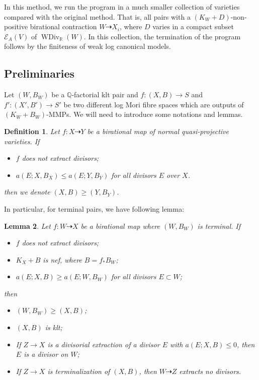 \documentclass[11pt]{amsart}
\newtheorem{defn}{Definition}[section]
\newtheorem{lem}[defn]{Lemma}
\begin{document}
In this method, we run the program in a much smaller collection of varieties compared with the original method. That is, all pairs with a $(K_{W}+D)$-non-positive birational contraction $W\dashrightarrow X_{i}$, where $D$ varies in a compact subset $\mathcal{E}_{A}(V)$ of $\operatorname{WDiv}_{\mathbb{R}}(W)$. In this collection, the termination of the program follows by the finiteness of weak log canonical models. 
\subsection{Preliminaries}
Let $(W,B_W)$ be a $\mathbb{Q}$-factorial klt pair and $f:(X,B)\to S$ and $f':(X',B')\to S'$ be two different log Mori fibre spaces which are outputs of $(K_{W}+B_{W})$-MMPs.  We will need to introduce some notations and lemmas.
\begin{defn}
Let $f:X\dashrightarrow Y$ be a birational map of normal quasi-projective varieties. If
\begin{itemize}
  \item $f$ does not extract divisors;
  \item $a(E;X,B_{X})\leqslant a(E;Y,B_{Y})$ for all divisors  $E$  over $X$.
\end{itemize}
then we denote $(X,B)\geqslant (Y,B_{Y})$.
\end{defn}
In particular, for terminal pairs, we have following lemma: 
\begin{lem}\label{terminalorder}
\cite[Lemma 13.8]{haconMinimalModelProgram2012} Let $f:W\dashrightarrow X$ be a birational map where $(W,B_W)$ is terminal. If
\begin{itemize}
  \item $f$ does not extract divisors;
  \item $K_X+B$ is nef, where $B=f_*B_W$;
  \item $a(E;X,B)\geqslant a(E;W,B_W)$ for all divisors $E \subset W$;
\end{itemize}
then
\begin{itemize}
  \item $(W,B_W)\geqslant (X,B)$;
  \item $(X,B)$ is klt;
  \item If $Z\to X$ is a divisorial extraction of a divisor $E$ with $a(E;X,B)\leqslant 0$, then $E$ is a divisor on $W$;
  \item If $Z\to X$ is terminalization of $(X,B)$, then $W\dashrightarrow Z$ extracts no divisors.
\end{itemize}
\end{lem}
\end{document}
